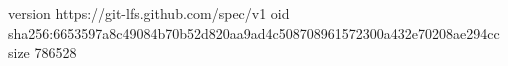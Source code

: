 version https://git-lfs.github.com/spec/v1
oid sha256:6653597a8c49084b70b52d820aa9ad4c508708961572300a432e70208ae294cc
size 786528
